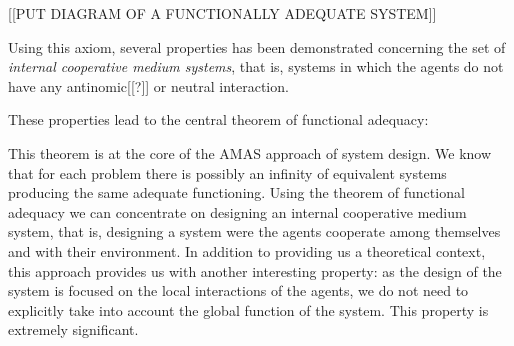 [[PUT DIAGRAM OF A FUNCTIONALLY ADEQUATE SYSTEM]]

Using this axiom, several properties has been demonstrated concerning the set of \emph{internal cooperative medium systems}, that is, systems in which the agents do not have any antinomic[[?]] or neutral interaction.


%
%

These properties lead to the central theorem of functional adequacy:


This theorem is at the core of the AMAS approach of system design. We know that for each problem there is possibly an infinity of equivalent systems producing the same adequate functioning. Using the theorem of functional adequacy we can concentrate on designing an internal cooperative medium system, that is, designing a system were the agents cooperate among themselves and with their environment.
In addition to providing us a theoretical context, this approach provides us with another interesting property: as the design of the system is focused on the local interactions of the agents, we do not need to explicitly take into account the global function of the system. This property is extremely significant. 


